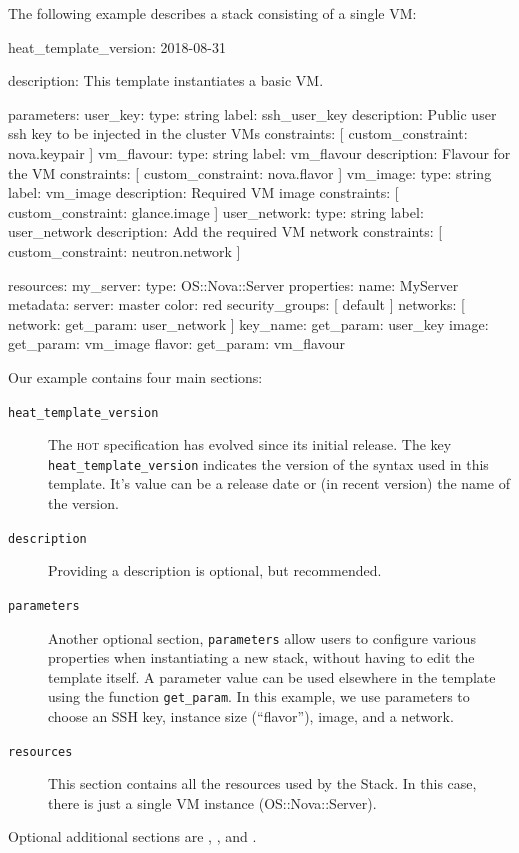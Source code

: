 The following example describes a stack consisting of
a single VM:
\begin{code}{}
heat_template_version: 2018-08-31

description: This template instantiates a basic VM.

parameters:
    user_key:
        type: string
        label: ssh_user_key
        description: Public user ssh key to be injected in the cluster VMs
        constraints: [ custom_constraint: nova.keypair ]
    vm_flavour:
        type: string
        label: vm_flavour
        description: Flavour for the VM
        constraints: [ custom_constraint: nova.flavor ]
    vm_image:
        type: string
        label: vm_image
        description: Required VM image
        constraints: [ custom_constraint: glance.image ]
    user_network:
        type: string
        label: user_network
        description: Add the required VM network
        constraints: [ custom_constraint: neutron.network ]

resources:
    my_server:
        type: OS::Nova::Server
        properties:
          name: MyServer
          metadata:
              server: master
              color: red
          security_groups: [ default ]
          networks: [ network: { get_param: user_network } ]
          key_name: { get_param: user_key }
          image: { get_param: vm_image }
          flavor: { get_param: vm_flavour }
\end{code}

Our example contains four main sections:
\begin{description}
\item[\texttt{heat\_template\_version}] The \textsc{hot} specification
  has evolved since its initial release.  The key
  \lstinline{heat_template_version} indicates the version of the
  syntax used in this template.  It's value can be a release date or
  (in recent version) the name of the version.
\item[\texttt{description}] Providing a description is optional, but
  recommended.
\item[\texttt{parameters}] Another optional section,
  \lstinline{parameters} allow users to configure various properties
  when instantiating a new stack, without having to edit the template
  itself.  A parameter value can be used elsewhere in the template
  using the function \lstinline{get_param}.  In this example, we use
  parameters to choose an SSH key, instance size (``flavor''), image,
  and a network.
\item[\texttt{resources}] This section contains all the resources used
  by the Stack.  In this case, there is just a single VM instance
  (OS::Nova::Server).
\end{description}
Optional additional sections are ,
, and .

